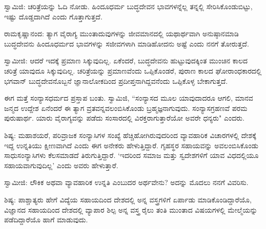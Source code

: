 ಸ್ವಾಮಿಜಿ: ಚರಿತ್ರೆಯನ್ನು ಓದಿ ನೋಡು. ಹಿಂದೂಧರ್ಮ ಬುದ್ಧದೇವನ ಭಾವಗಳನ್ನೆಲ್ಲ ತನ್ನಲ್ಲಿ ಸೇರಿಸಿಕೊಂಡುಬಿಟ್ಟು, ಇಷ್ಟು ದೊಡ್ಡದಾಗಿದೆ ಎಂದು ಗೊತ್ತಾಗುತ್ತದೆ.

ರಾಮಕೃಷ್ಣಾನಂದ: ತ್ಯಾಗ ವೈರಾಗ್ಯ ಮುಂತಾದುವುಗಳನ್ನು ಜೀವಮಾನದಲ್ಲಿ ಯಥಾರ್ಥವಾಗಿ ಅನುಷ್ಠಾನಮಾಡಿ ಬುದ್ಧದೇವನು ಹಿಂದೂಧರ್ಮದ ಭಾವಗಳನ್ನು ಸಜೀವಗಳಾಗಿ ಮಾಡಿಹೋದನು ಅಷ್ಟೆ ಎಂದು ನನಗೆ ತೋರುತ್ತದೆ.

ಸ್ವಾಮೀಜಿ: ಆದರೆ ಇದಕ್ಕೆ ಪ್ರಮಾಣ ಸಿಕ್ಕುವುದಿಲ್ಲ. ಏಕೆಂದರೆ, ಬುದ್ಧದೇವನು ಹುಟ್ಟುವುದಕ್ಕಿಂತ ಮುಂಚಿನ ಕಾಲದ ಚರಿತ್ರೆ ಯಾವುದೂ ಸಿಕ್ಕುವುದಿಲ್ಲ. ಚರಿತ್ರೆಯನ್ನು ಪ್ರಮಾಣವೆಂದು ಒಪ್ಪಿಕೊಂಡರೆ, ಪುರಾಣ ಕಾಲದ ಘೋರಾಂಧಕಾರದಲ್ಲಿ ಭಗವಾನ್ ಬುದ್ಧದೇವನೊಬ್ಬನೆ ಜ್ಞಾನಾಲೋಕದಿಂದ ಪ್ರದೀಪ್ತನಾಗಿದ್ದವನೆಂದು ಒಪ್ಪಿಕೊಳ್ಳ ಬೇಕಾಗುತ್ತದೆ.

ಈಗ ಮತ್ತೆ ಸಂನ್ಯಾಸಧರ್ಮದ ಪ್ರಸ್ತಾಪ ಬಂತು. ಸ್ವಾಮಿಜಿ, “ಸಂನ್ಯಾಸದ ಮೂಲ ಯಾವುದಾದರೂ ಆಗಲಿ, ಮಾನವ ಜನ್ಮದ ಉದ್ದೇಶ ಏನೆಂದರೆ ಈ ತ್ಯಾಗ ವ್ರತವನ್ನವಲಂಬಿಸಿಕೊಂಡು ಬ್ರಹ್ಮಜ್ಞನಾಗುವುದು. ಸಂನ್ಯಾಸಗ್ರಹಣವೆ ಪರಮ ಪುರುಷಾರ್ಥ. ಯಾರು ವೈರಾಗ್ಯವನ್ನು ಪಡೆದು ಸಂಸಾರದಲ್ಲಿ ವಿರಕ್ತರಾಗುತ್ತಾರೆಯೋ ಅವರೇ ಧನ್ಯರು" ಎಂದರು.

ಶಿಷ್ಯ: ಮಹಾಶಯರೆ, ಪರಿವ್ರಾಜಕ ಸಂನ್ಯಾಸಿಗಳ ಸಂಖ್ಯೆ ಹೆಚ್ಚಿಹೋಗಿರುವುದರಿಂದ ವ್ಯಾವಹಾರಿಕ ವಿಚಾರಗಳಲ್ಲಿ ದೇಶಕ್ಕೆ ಇದ್ದ ಉನ್ನತಿಯು ಕ್ಷೀಣವಾಗಿದೆ ಎಂದು ಈಗ ಅನೇಕರು ಹೇಳುತ್ತಿದ್ದಾರೆ. ಗೃಹಸ್ಥರ ಸಹಾಯವನ್ನು ಅವಲಂಬಿಸಿಕೊಂಡು ಸಾಧುಸಂನ್ಯಾಸಿಗಳು ಕೆಲಸಮಾಡದೆ ತಿರುಗುತ್ತಿದ್ದಾರೆ. ‘ಇದರಿಂದ ಸಮಾಜ ಮತ್ತು ಸ್ವದೇಶಗಳಿಗೆ ಯಾವ ವಿಧದಲ್ಲಿಯೂ ಸಹಾಯವಾಗುವುದಿಲ್ಲ’ ಎಂದು ಅವರು ಹೇಳುತ್ತಾರೆ.

ಸ್ವಾಮೀಜಿ: ಲೌಕಿಕ ಅಥವಾ ವ್ಯಾವಹಾರಿಕ ಉನ್ನತಿ ಎಂಬುದರ ಅರ್ಥವೇನು? ಅದನ್ನು ಮೊದಲು ನನಗೆ ವಿವರಿಸು.

ಶಿಷ್ಯ: ಪಾಶ್ಚಾತ್ಯರು ಹೇಗೆ ವಿದ್ಯೆಯ ಸಹಾಯದಿಂದ ದೇಶದಲ್ಲಿ ಅನ್ನ ವಸ್ತ್ರಗಳಿಗೆ ಏರ್ಪಾಡು ಮಾಡಿಕೊಂಡಿದ್ದಾರೆಯೊ, ವಿಜ್ಞಾನದ ಸಹಾಯದಿಂದ ದೇಶದಲ್ಲಿ ವ್ಯಾಪಾರ ಶಿಲ್ಪ ಅನ್ನ ವಸ್ತ್ರ ರೈಲು ತಂತಿ ಮುಂತಾದ ವಿಷಯಗಳಲ್ಲಿ ಮೇಲ್ಮೆಯನ್ನು ಪಡೆದಿದ್ದಾರೆಯೊ ಹಾಗೆ ಮಾಡುವುದು.


